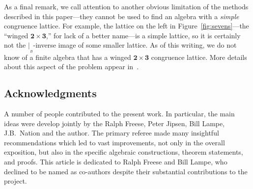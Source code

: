 \documentclass{au}
\numberwithin{equation}{section}
\theoremstyle{plain}
\theoremstyle{definition}
\newcommand{\<}{\ensuremath{\langle}}
\renewcommand{\>}{\ensuremath{\rangle}}
\newcommand{\bA}{\ensuremath{\mathbf{A}}}
\newcommand{\resB}{\ensuremath{|_{_B}}}
\newcommand{\two}{\ensuremath{\mathbf{2}}}
\newcommand{\three}{\ensuremath{\mathbf{3}}}
\begin{document}
As a final remark, we call attention to another obvious limitation of
the methods described in this paper---they cannot be used to find an
algebra with a \emph{simple} congruence lattice.  For example, the lattice on
the left in Figure~\ref{fig:sevens}---the
``winged $\two \times \three$,''  for lack of a better name---is a simple
lattice, so it is certainly not the $\resB$-inverse image of some
smaller lattice.
As of this writing, we do not know of a finite algebra that has
a winged $\two \times \three$ congruence lattice.  More details about this
aspect of the problem appear in~\cite{IEProps}. 



\subsection*{Acknowledgments}
  A number of people contributed to the present work.  
  In particular, the main ideas were develop jointly
  by the Ralph Freese, Peter Jipsen, Bill Lampe, J.B.~Nation and the author.
  The primary referee made many insightful recommendations
  which led to vast improvements, not only in the overall exposition, but also in
  the specific algebraic constructions, theorem statements, and proofs.
  This article is dedicated to Ralph Freese and Bill Lampe, who
  declined to be named as co-authors despite their substantial contributions to the project.
\end{document}
